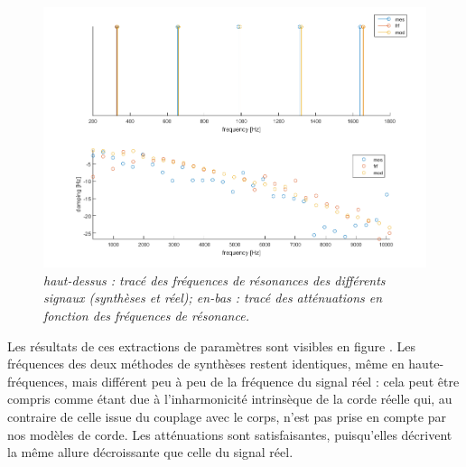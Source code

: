 \begin{figure}[hpbt]
\includegraphics[scale=0.65]{figures/apotheose.png}
\caption{\textit{haut-dessus : tracé des fréquences de résonances des différents signaux (synthèses et réel); en-bas : tracé des atténuations en fonction des fréquences de résonance.}}
\label{apo}
\end{figure}

Les résultats de ces extractions de paramètres sont visibles en figure \label{apo}. Les fréquences des deux méthodes de synthèses restent identiques, même en haute-fréquences, mais différent peu à peu de la fréquence du signal réel : cela peut être compris comme étant due à l'inharmonicité intrinsèque de la corde réelle qui, au contraire de celle issue du couplage avec le corps, n'est pas prise en compte par nos modèles de corde. Les atténuations sont satisfaisantes, puisqu'elles décrivent la même allure décroissante que celle du signal réel.

